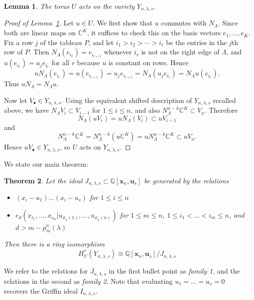 \documentclass[11pt]{amsart}
\numberwithin{equation}{section}
\newtheorem{theorem}{Theorem}[section]
\newtheorem{lemma}[theorem]{Lemma}
\theoremstyle{definition}
\newcommand{\CC}{{\mathbb{C}}}
\newcommand{\QQ}{{\mathbb{Q}}}
\newcommand{\xxx}{{\mathbf{x}}}
\newcommand{\uuu}{{\mathbf{u}}}
\begin{document}
\begin{lemma}\label{lem:UactsonYnls}
    The torus $U$ acts on the variety $Y_{n,\lambda,s}$.
\end{lemma}

\begin{proof}[Proof of Lemma~\ref{lem:UactsonYnls}]
    Let $u\in U$. We first show that $u$ commutes with $N_\Lambda$.
    Since both are linear maps on $\CC^K$, it suffices to check this on the
    basis vectors $e_1,\dots,e_K$. Fix a row $j$ of the tableau $P$, and let
    $i_1>i_2>\cdots>i_\ell$ be the entries in the $j$th row of $P$. Then
    $N_\Lambda(e_{i_r})=e_{i_{r+1}}$ whenever $i_r$ is not on the right edge of
    $\Lambda$, and $u(e_{i_r})=u_j e_{i_r}$ for all $r$ because $u$ is constant
    on rows. Hence
    \[
    uN_\Lambda(e_{i_r})=u(e_{i_{r+1}})=u_j e_{i_{r+1}}
    =N_\Lambda(u_j e_{i_r})=N_\Lambda u(e_{i_r}).
    \]
    Thus $uN_\Lambda=N_\Lambda u$.

    Now let $V_\bullet\in Y_{n,\lambda,s}$. Using the equivalent shifted
    description of $Y_{n,\lambda,s}$ recalled above, we have
    $N_\Lambda V_i\subset V_{i-1}$ for $1\leq i\leq n$, and also
    $N_\Lambda^{n-k}\CC^K\subset V_n$. Therefore
    \[
    N_\Lambda(uV_i)=uN_\Lambda(V_i)\subset uV_{i-1}
    \]
    and
    \[
    N_\Lambda^{n-k}\CC^K
    =N_\Lambda^{n-k}(u\CC^K)
    =uN_\Lambda^{n-k}\CC^K
    \subset uV_n.
    \]
    Hence $uV_\bullet\in Y_{n,\lambda,s}$, so $U$ acts on $Y_{n,\lambda,s}$.
\end{proof}

We state our main theorem:

\begin{theorem}\label{thm: main}
    Let the ideal $J_{n,\lambda,s} \subset \QQ[\xxx_n,\uuu_s]$ be generated by the relations 
    \begin{itemize}
        \item $(x_i - u_1)\dots(x_i - u_s)$ for $1 \leq i \leq n$
        \item $e_d(x_{i_1},\dots,x_{i_m} | u_{\phi_\lambda(1)},\dots,u_{\phi_\lambda(n)})$ for $1 \leq m \leq n$, $1 \leq i_1 < \dots < i_m \leq n$, and $d > m - p^n_m(\lambda)$
    \end{itemize}
    Then there is a ring isomorphism
    \begin{equation}\label{eq: maintheorem}
        H^*_U(Y_{n,\lambda,s}) \cong \QQ[\xxx_n,\uuu_s]/J_{n,\lambda,s}
    \end{equation}
\end{theorem}
We refer to the relations for $J_{n,\lambda,s}$ in the first bullet point as \emph{family 1}, and the relations in the second as \emph{family 2}. Note that evaluating $u_1 = \dots = u_s = 0$ recovers the Griffin ideal $I_{n,\lambda,s}$.
\end{document}
